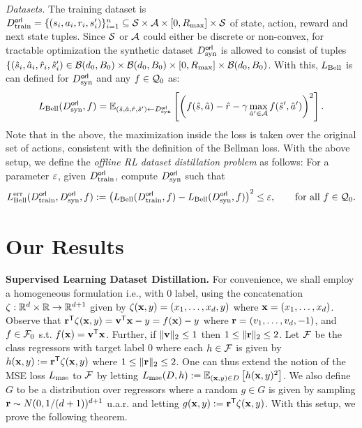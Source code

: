 {\it Datasets.} The training dataset is $D^{\sf orl}_{\textnormal{train}} = \{(s_i, a_i, r_i, s_i')\}_{i=1}^n \subseteq \mathcal{S}\times \mathcal{A} \times [0, R_{\textnormal{max}}] \times \mathcal{S}$ of  state, action, reward and next state tuples. Since $\mathcal{S}$ or $\mathcal{A}$ could either be discrete or non-convex, for tractable optimization the synthetic dataset $D^{\sf orl}_{\textnormal{syn}}$ is allowed to consist of tuples $\{(\hat{s}_i, \hat{a}_i, \hat{r}_i, \hat{s}_i') \in \mathcal{B}(d_0, B_0) \times \mathcal{B}(d_0, B_0) \times [0, R_{\textnormal{max}}] \times \mathcal{B}(d_0, B_0)$. With this, $L_{\textnormal{Bell}}$ is can defined for $D^{\sf orl}_{\textnormal{syn}}$ and any $f \in \mathcal{Q}_0$ as:
\begin{equation}
    L_{\textnormal{Bell}}(D^{\sf orl}_{\textnormal{syn}}, f) = \mathbb{E}_{(\hat{s}, \hat{a}, \hat{r}, \hat{s}') \leftarrow D^{\sf orl}_{\textnormal{syn}}}\left[\left(f(\hat{s}, \hat{a}) - \hat{r} - \gamma \max_{\hat{a}' \in  \mathcal{A}} f(\hat{s}',\hat{a}')\right)^2\right]. 
\end{equation}
Note that in the above, the maximization inside the loss is taken over the original set of actions, consistent with the definition of the Bellman loss. %
With the above setup, we define the \textit{offline RL dataset distillation problem} as follows: For a parameter ${\varepsilon}$, given $D^{\sf orl}_{\textnormal{train}}$, compute $D^{\sf orl}_{\textnormal{syn}}$ such that
\begin{equation}
    L^{\textnormal{err}}_{\textnormal{Bell}}(D^{\sf orl}_{\textnormal{train}}, D^{\sf orl}_{\textnormal{syn}}, f) := \left(L_{\textnormal{Bell}}(D^{\sf orl}_{\textnormal{train}}, f) - L_{\textnormal{Bell}}(D^{\sf orl}_{\textnormal{syn}}, f)\right)^2 \leq {\varepsilon}, \qquad  \textnormal{for all  } f \in \mathcal{Q}_0.  \label{eqn:errBell}
\end{equation}


\section{Our Results} \label{sec:our_results}
{\bf Supervised Learning Dataset Distillation.}  For convenience, we shall employ a homogeneous formulation i.e., with $0$ label, using the concatenation $\zeta : \mathbb{R}^d \times \mathbb{R} \to \mathbb{R}^{d+1}$ given by $\zeta({\mathbf{x}} , y) = (x_1, \dots, x_d, y)$ where ${\mathbf{x}} = (x_1, \dots, x_d)$.  Observe that ${\mathbf{r}}^{\sf T}\zeta({\mathbf{x}}, y) = {\mathbf{v}}^{\sf T}{\mathbf{x}} - y = f({\mathbf{x}}) - y$ where ${\mathbf{r}} = (v_1, \dots, v_d, -1)$,  and $f \in \mathcal{F}_0$ s.t. $f({\mathbf{x}}) = {\mathbf{v}}^{\sf T}{\mathbf{x}}$. Further, if $\|{\mathbf{v}}\|_2 \leq 1$ then $1 \leq \|{\mathbf{r}}\|_2 \leq 2$. Let $\mathcal{F}$ be the class regressors with target label $0$ where each $h \in \mathcal{F}$ is given by $h({\mathbf{x}}, y) := {\mathbf{r}}^{\sf T}\zeta({\mathbf{x}}, y)$ where $1\leq \|{\mathbf{r}}\|_2 \leq 2$. One can thus extend the notion of the MSE loss $L_{\textnormal{\ensuremath{\textnormal{mse}}}}$ to $\mathcal{F}$ by letting $L_{\textnormal{mse}}(D, h) := \mathbb{E}_{({\mathbf{x}}, y)\in D}\left[h({\mathbf{x}}, y)^2\right]$.  We also define $G$ to be a distribution over regressors where a random $g \in G$ is given by sampling ${\mathbf{r}} \sim N(0,1/(d+1))^{d+1}$ u.a.r. and letting $g({\mathbf{x}}, y) := {\mathbf{r}}^{\sf T}\zeta({\mathbf{x}}, y)$. With this setup, we prove the following theorem.

